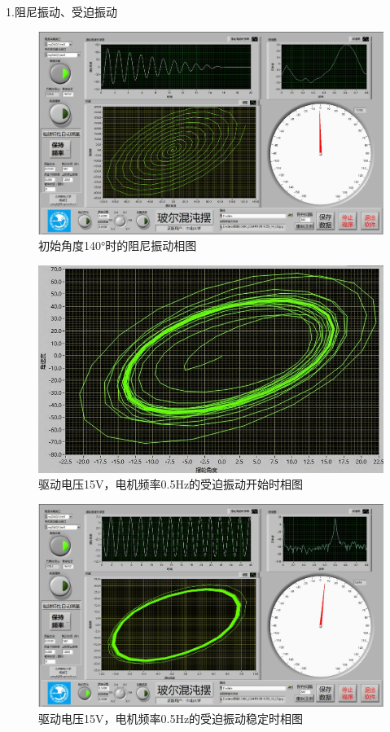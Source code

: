 \documentclass[dvipsnames, svgnames,a4paper,11pt]{article}
\begin{document}
1.阻尼振动、受迫振动
\begin{figure}[H]
	\includegraphics[width=\textwidth]{姚昊廷22322091/140阻尼.jpg}
	\caption{初始角度140°时的阻尼振动相图}
\end{figure}
\begin{figure}[H]
	\includegraphics[width=\textwidth]{3-57.png}
	\caption{驱动电压15V，电机频率0.5Hz的受迫振动开始时相图}
\end{figure}

\begin{figure}[H]
	\includegraphics[width=\textwidth]{姚昊廷22322091/15V受迫.jpg}
	\caption{驱动电压15V，电机频率0.5Hz的受迫振动稳定时相图}
\end{figure}
\end{document}
